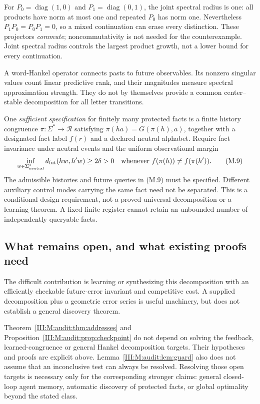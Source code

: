 For $P_0=\operatorname{diag}(1,0)$ and
$P_1=\operatorname{diag}(0,1)$, the joint spectral radius is one:
all products have norm at most one and repeated $P_0$ has norm one.
Nevertheless $P_1P_0=P_0P_1=0$, so a mixed continuation can erase every
distinction. These projectors \emph{commute}; noncommutativity is not needed
for the counterexample. Joint spectral radius controls the largest product
growth, not a lower bound for every continuation.

A word-Hankel operator connects pasts to future observables. Its nonzero
singular values count linear predictive rank, and their magnitudes measure
spectral approximation strength. They do not by themselves provide a
common center--stable decomposition for all letter transitions.

One \emph{sufficient specification} for finitely many protected facts is a
finite history congruence $\pi:\Sigma^*\to\mathcal R$ satisfying
$\pi(ha)=G(\pi(h),a)$, together with a designated fact label $f(r)$ and
a declared neutral alphabet. Require fact invariance under neutral events
and the uniform observational margin
\[
 \inf_{w\in\Sigma_{\rm neutral}^*}
 d_{\rm fut}(hw,h'w)\ge2\delta>0
 \quad\text{whenever } f(\pi(h))\ne f(\pi(h')).       \tag{M.9}
\]
The admissible histories and future queries in (M.9) must be specified.
Different auxiliary control modes carrying the same fact need not be
separated. This is a conditional design requirement, not a proved universal
decomposition or a learning theorem. A fixed finite register cannot retain
an unbounded number of independently queryable facts.

\subsection{What remains open, and what existing proofs need}
The difficult contribution is learning or synthesizing this decomposition
with an efficiently checkable future-error invariant and competitive cost.
A supplied decomposition plus a geometric error series is useful machinery,
but does not establish a general discovery theorem.

Theorem~\ref{III:M:audit:thm:addresses} and Proposition~\ref{III:M:audit:prop:checkpoint} do not
depend on solving the feedback, learned-congruence or general Hankel
decomposition targets. Their hypotheses and proofs are explicit above.
Lemma~\ref{III:M:audit:lem:guard} also does not assume that an inconclusive test can
always be resolved. Resolving those open targets is necessary only for the
corresponding stronger claims: general closed-loop agent memory, automatic
discovery of protected facts, or global optimality beyond the stated class.

